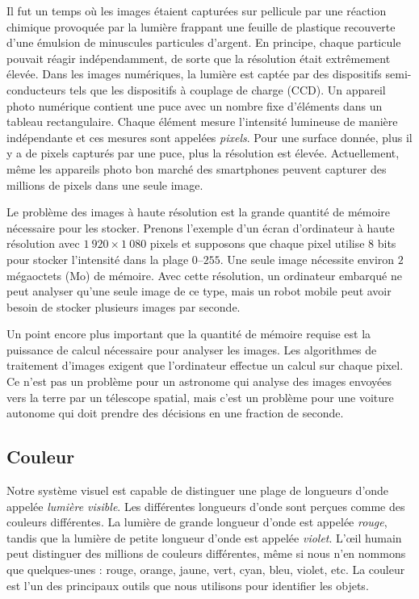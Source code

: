 Il fut un temps où les images étaient capturées sur pellicule par une réaction chimique provoquée par la lumière frappant une feuille de plastique recouverte d'une émulsion de minuscules particules d'argent. En principe, chaque particule pouvait réagir indépendamment, de sorte que la résolution était extrêmement élevée. Dans les images numériques, la lumière est captée par des dispositifs semi-conducteurs tels que les dispositifs à couplage de charge (CCD). Un appareil photo numérique contient une puce avec un nombre fixe d'éléments dans un tableau rectangulaire. Chaque élément mesure l'intensité lumineuse de manière indépendante et ces mesures sont appelées \emph{pixels}. Pour une surface donnée, plus il y a de pixels capturés par une puce, plus la résolution est élevée. Actuellement, même les appareils photo bon marché des smartphones peuvent capturer des millions de pixels dans une seule image.

Le problème des images à haute résolution est la grande quantité de mémoire nécessaire pour les stocker. Prenons l'exemple d'un écran d'ordinateur à haute résolution avec $1\:920 \times 1\:080$ pixels et supposons que chaque pixel utilise $8$ bits pour stocker l'intensité dans la plage $0$--$255$. Une seule image nécessite environ $2$ mégaoctets (Mo) de mémoire. Avec cette résolution, un ordinateur embarqué ne peut analyser qu’une seule image de ce type, mais un robot mobile peut avoir besoin de stocker plusieurs images par seconde.

Un point encore plus important que la quantité de mémoire requise est la puissance de calcul nécessaire pour analyser les images. Les algorithmes de traitement d'images exigent que l'ordinateur effectue un calcul sur chaque pixel. Ce n'est pas un problème pour un astronome qui analyse des images envoyées vers la terre par un télescope spatial, mais c'est un problème pour une voiture autonome qui doit prendre des décisions en une fraction de seconde.

\subsection*{Couleur}

Notre système visuel est capable de distinguer une plage de longueurs d'onde appelée \emph{lumière visible}. Les différentes longueurs d'onde sont perçues comme des couleurs différentes. La lumière de grande longueur d'onde est appelée \emph{rouge}, tandis que la lumière de petite longueur d'onde est appelée \emph{violet}. L'œil humain peut distinguer des millions de couleurs différentes, même si nous n'en nommons que quelques-unes : rouge, orange, jaune, vert, cyan, bleu, violet, etc. La couleur est l'un des principaux outils que nous utilisons pour identifier les objets.

